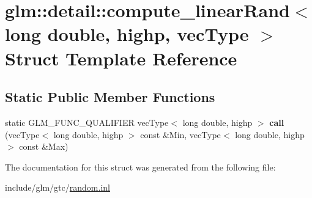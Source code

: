 \hypertarget{structglm_1_1detail_1_1compute__linearRand_3_01long_01double_00_01highp_00_01vecType_01_4}{}\section{glm\+:\+:detail\+:\+:compute\+\_\+linear\+Rand$<$ long double, highp, vec\+Type $>$ Struct Template Reference}
\label{structglm_1_1detail_1_1compute__linearRand_3_01long_01double_00_01highp_00_01vecType_01_4}
\subsection*{Static Public Member Functions}
\begin{DoxyCompactItemize}
\item 
\mbox{\label{structglm_1_1detail_1_1compute__linearRand_3_01long_01double_00_01highp_00_01vecType_01_4_ace5ddc612cfa5043fad6b875fdb86553}} 
static G\+L\+M\+\_\+\+F\+U\+N\+C\+\_\+\+Q\+U\+A\+L\+I\+F\+I\+ER vec\+Type$<$ long double, highp $>$ {\bfseries call} (vec\+Type$<$ long double, highp $>$ const \&Min, vec\+Type$<$ long double, highp $>$ const \&Max)
\end{DoxyCompactItemize}


The documentation for this struct was generated from the following file\+:\begin{DoxyCompactItemize}
\item 
include/glm/gtc/\hyperlink{random_8inl}{random.\+inl}\end{DoxyCompactItemize}
